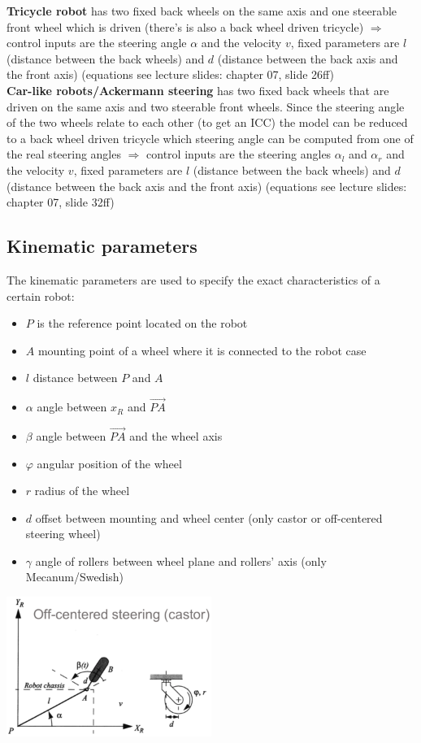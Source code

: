 \documentclass[12pt]{article}
\begin{document}
	\textbf{Tricycle robot} has two fixed back wheels on the same axis and one steerable front wheel which is driven (there's is also a back wheel driven tricycle) $\Rightarrow$ control inputs are the steering angle $\alpha$ and the velocity $v$, fixed parameters are $l$ (distance between the back wheels) and $d$ (distance between the back axis and the front axis) (equations see lecture slides: chapter 07, slide 26ff)\\
	\textbf{Car-like robots/Ackermann steering} has two fixed back wheels that are driven on the same axis and two steerable front wheels. Since the steering angle of the two wheels relate to each other (to get an ICC) the model can be reduced to a back wheel driven tricycle which steering angle can be computed from one of the real steering angles $\Rightarrow$ control inputs are the steering angles $\alpha_l$ and $\alpha_r$ and the velocity $v$, fixed parameters are $l$ (distance between the back wheels) and $d$ (distance between the back axis and the front axis) (equations see lecture slides: chapter 07, slide 32ff)
	
	
	\subsection{Kinematic parameters}
	The kinematic parameters are used to specify the exact characteristics of a certain robot:
	\begin{itemize}
		\item $P$ is the reference point located on the robot
		\item $A$ mounting point of a wheel where it is connected to the robot case
		\item $l$ distance between $P$ and $A$
		\item $\alpha$ angle between $x_R$ and $\vec{PA}$
		\item $\beta$ angle between $\vec{PA}$ and the wheel axis
		\item $\varphi$ angular position of the wheel
		\item $r$ radius of the wheel
		\item $d$ offset between mounting and wheel center (only castor or off-centered steering wheel)
		\item $\gamma$ angle of rollers between wheel plane and rollers' axis (only Mecanum/Swedish)
	\end{itemize}
	\includegraphics[width=0.5\textwidth]{figures/example-kinematic-parameters.png}
	
\end{document}
